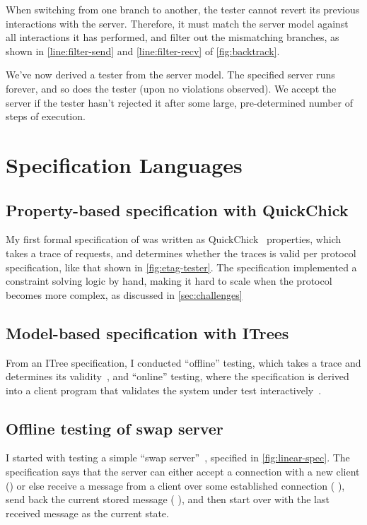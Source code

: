 When switching from one branch to another, the tester cannot revert its previous
interactions with the server.  Therefore, it must match the server model against
all interactions it has performed, and filter out the mismatching branches, as
shown in \autoref{line:filter-send} and \autoref{line:filter-recv} of
\autoref{fig:backtrack}.

We've now derived a tester from the server model.  The specified server runs
forever, and so does the tester (upon no violations observed).  We accept the
server if the tester hasn't rejected it after some large, pre-determined number
of steps of execution.


\iffalse
\section{Specification Languages}

\subsection{Property-based specification with QuickChick}
My first formal specification of \http was written as
QuickChick~\cite{quickchick} properties, which takes a trace of requests, and
determines whether the traces is valid per protocol specification, like that
shown in \autoref{fig:etag-tester}.  The specification implemented a constraint
solving logic by hand, making it hard to scale when the protocol becomes more
complex, as discussed in \autoref{sec:challenges}

\subsection{Model-based specification with ITrees}

From an ITree specification, I conducted ``offline'' testing, which takes a
trace and determines its validity~\cite{cpp19}, and ``online'' testing, where
the specification is derived into a client program that validates the system
under test interactively~\cite{issta21}.

\subsection{Offline testing of swap server}
I started with testing a simple ``swap server''~\cite{cpp19}, specified in
\autoref{fig:linear-spec}.  The specification says that the server can either
accept a connection with a new client () or else receive a
message from a client over some established connection (
), send back the current stored message (
 ), and then start over with the last received message as
the current state.

